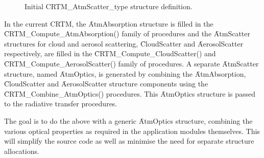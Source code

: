 \begin{figure}[htp]
  \centering
  \caption{Initial CRTM\_AtmScatter\_type structure definition.}
  \label{fig:CRTM_AtmScatter_type_structure}
\end{figure}

In the current CRTM, the \f{AtmAbsorption} structure is filled in the \f{CRTM\_Compute\_AtmAbsorption()} family of procedures and the \f{AtmScatter} structures for cloud and aerosol scattering, \f{CloudScatter} and \f{AerosolScatter} respectively, are filled in the \f{CRTM\_Compute\_CloudScatter()} and \f{CRTM\_Compute\_AerosolScatter()} family of procedures. A separate \f{AtmScatter} structure, named \f{AtmOptics}, is generated by combining the \f{AtmAbsorption}, \f{CloudScatter} and \f{AerosolScatter} structure components using the \f{CRTM\_Combine\_AtmOptics()} procedures. This \f{AtmOptics} structure is passed to the radiative transfer procedures.

The goal is to do the above with a generic \f{AtmOptics} structure, combining the various optical properties as required in the application modules themselves. This will simplify the source code as well as minimise the need for separate structure allocations.


